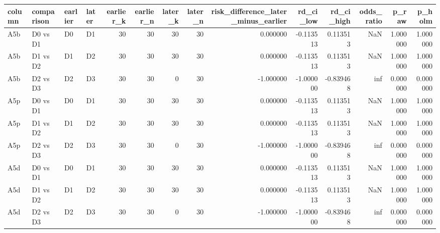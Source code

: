 \begin{tabular}{llllrrrrrrrrrr}
\toprule
column & comparison & earlier & later & earlier\_k & earlier\_n & later\_k & later\_n & risk\_difference\_later\_minus\_earlier & rd\_ci\_low & rd\_ci\_high & odds\_ratio & p\_raw & p\_holm \\
\midrule
A5b & D0 vs D1 & D0 & D1 & 30 & 30 & 30 & 30 & 0.000000 & -0.113513 & 0.113513 & NaN & 1.000000 & 1.000000 \\
A5b & D1 vs D2 & D1 & D2 & 30 & 30 & 30 & 30 & 0.000000 & -0.113513 & 0.113513 & NaN & 1.000000 & 1.000000 \\
A5b & D2 vs D3 & D2 & D3 & 30 & 30 & 0 & 30 & -1.000000 & -1.000000 & -0.839468 & inf & 0.000000 & 0.000000 \\
A5p & D0 vs D1 & D0 & D1 & 30 & 30 & 30 & 30 & 0.000000 & -0.113513 & 0.113513 & NaN & 1.000000 & 1.000000 \\
A5p & D1 vs D2 & D1 & D2 & 30 & 30 & 30 & 30 & 0.000000 & -0.113513 & 0.113513 & NaN & 1.000000 & 1.000000 \\
A5p & D2 vs D3 & D2 & D3 & 30 & 30 & 0 & 30 & -1.000000 & -1.000000 & -0.839468 & inf & 0.000000 & 0.000000 \\
A5d & D0 vs D1 & D0 & D1 & 30 & 30 & 30 & 30 & 0.000000 & -0.113513 & 0.113513 & NaN & 1.000000 & 1.000000 \\
A5d & D1 vs D2 & D1 & D2 & 30 & 30 & 30 & 30 & 0.000000 & -0.113513 & 0.113513 & NaN & 1.000000 & 1.000000 \\
A5d & D2 vs D3 & D2 & D3 & 30 & 30 & 0 & 30 & -1.000000 & -1.000000 & -0.839468 & inf & 0.000000 & 0.000000 \\
\bottomrule
\end{tabular}
